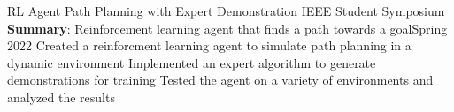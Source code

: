\resumeSubheading
{RL Agent Path Planning with Expert Demonstration}
{{IEEE Student Symposium}}
{\textbf{Summary}: Reinforcement learning agent that finds a path towards a goal}{Spring 2022}
\resumeItemListStart
\resumeItem
{Created a reinforcment learning agent to simulate path planning in a dynamic environment}
\resumeItem
{Implemented an expert algorithm to generate demonstrations for training}
\resumeItem
{Tested the agent on a variety of environments and analyzed the results}
\resumeItemListEnd

